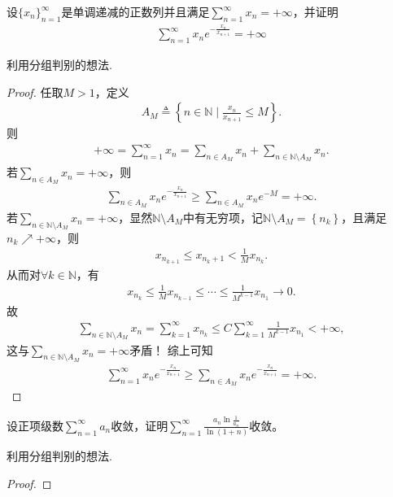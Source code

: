 \documentclass[../../main.tex]{subfiles}
\begin{document}
\begin{example}
设$\{ x_n \}_{n=1}^{\infty}$是单调递减的正数列并且满足$\sum_{n=1}^{\infty} x_n = +\infty$，并证明
\begin{align*}
\sum_{n=1}^{\infty} x_n e^{-\frac{x_n}{x_{n+1}}} = +\infty
\end{align*}
\end{example}
\begin{note}
利用分组判别的想法.
\end{note}
\begin{proof}
任取$M>1$，定义
\begin{align*}
A_M\triangleq \left\{ n\in \mathbb{N} \mid \frac{x_n}{x_{n+1}}\leqslant M \right\} .
\end{align*}
则
\begin{align*}
+\infty =\sum_{n=1}^{\infty}{x_n}=\sum_{n\in A_M}{x_n}+\sum_{n\in \mathbb{N} \setminus A_M}{x_n}.
\end{align*}
若$\sum_{n\in A_M}{x_n}=+\infty$，则
\begin{align*}
\sum_{n\in A_M}{x_ne^{-\frac{x_n}{x_{n+1}}}}\geqslant \sum_{n\in A_M}{x_ne^{-M}}=+\infty .
\end{align*}
若$\sum_{n\in \mathbb{N} \setminus A_M}{x_n}=+\infty$，显然$\mathbb{N} \setminus A_M$中有无穷项，记$\mathbb{N} \setminus A_M=\left\{ n_k \right\}$，且满足$n_k\nearrow +\infty$，则
\begin{align*}
x_{n_{k+1}}\leqslant x_{n_k+1}<\frac{1}{M}x_{n_k}.
\end{align*}
从而对$\forall k\in \mathbb{N}$，有
\begin{align*}
x_{n_k}\leqslant \frac{1}{M}x_{n_{k-1}}\leqslant \cdots \leqslant \frac{1}{M^{k-1}}x_{n_1}\rightarrow 0.
\end{align*}
故
\begin{align*}
\sum_{n\in \mathbb{N} \setminus A_M}{x_n}=\sum_{k=1}^{\infty}{x_{n_k}}\leqslant C\sum_{k=1}^{\infty}{\frac{1}{M^{k-1}}x_{n_1}}<+\infty ,
\end{align*}
这与$\sum_{n\in \mathbb{N} \setminus A_M}{x_n}=+\infty$矛盾！
综上可知
\begin{align*}
\sum_{n=1}^{\infty}{x_ne^{-\frac{x_n}{x_{n+1}}}}\geqslant \sum_{n\in A_M}{x_ne^{-\frac{x_n}{x_{n+1}}}}=+\infty .
\end{align*}

\end{proof}

\begin{example}
设正项级数$\sum_{n=1}^{\infty} a_n$收敛，证明$\sum_{n=1}^{\infty} \frac{a_n \ln \frac{1}{a_n}}{\ln (1 + n)}$收敛。
\end{example}
\begin{note}
利用分组判别的想法.
\end{note}
\begin{proof}


\end{proof}
\end{document}
